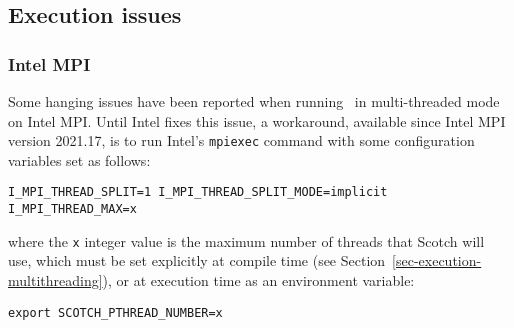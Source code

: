 \subsection{Execution issues}
\label{sec-execution-issues}

\subsubsection{Intel MPI}

Some hanging issues have been reported when running \ptscotch\ in
multi-threaded mode on Intel MPI. Until Intel fixes this issue, a
workaround, available since Intel MPI version 2021.17, is to run
Intel's \texttt{mpiexec} command with some configuration variables set
as follows:

\begin{lstlisting}[style=language-b]
I_MPI_THREAD_SPLIT=1 I_MPI_THREAD_SPLIT_MODE=implicit I_MPI_THREAD_MAX=x
\end{lstlisting}

\noi
where the \texttt{x} integer value is the maximum number of threads
that Scotch will use, which must be set explicitly at compile time
(see Section~\ref{sec-execution-multithreading}), or
at execution time as an environment variable:

\begin{lstlisting}[style=language-b]
export SCOTCH_PTHREAD_NUMBER=x
\end{lstlisting}

